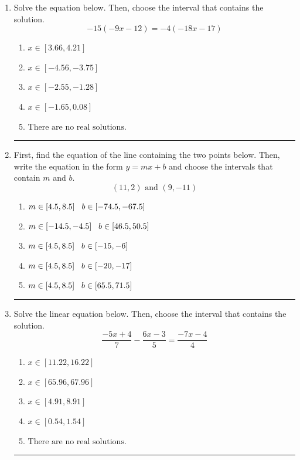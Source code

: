 \documentclass[14pt]{extbook}
\newcommand{\litem}[1]{\item#1\hspace*{-1cm}\rule{\textwidth}{0.4pt}}
\begin{document}
\begin{enumerate}
{\begin{enumerate}[label=\Alph*.]
\end{enumerate} }
\litem{
Solve the equation below. Then, choose the interval that contains the solution.\[ -15(-9x -12) = -4(-18x -17) \]\begin{enumerate}[label=\Alph*.]
\item \( x \in [3.66, 4.21] \)
\item \( x \in [-4.56, -3.75] \)
\item \( x \in [-2.55, -1.28] \)
\item \( x \in [-1.65, 0.08] \)
\item \( \text{There are no real solutions.} \)

\end{enumerate} }
\litem{
First, find the equation of the line containing the two points below. Then, write the equation in the form $ y=mx+b $ and choose the intervals that contain $m$ and $b$.\[ (11, 2) \text{ and } (9, -11) \]\begin{enumerate}[label=\Alph*.]
\item \( m \in [4.5, 8.5] \hspace*{3mm} b \in [-74.5, -67.5] \)
\item \( m \in [-14.5, -4.5] \hspace*{3mm} b \in [46.5, 50.5] \)
\item \( m \in [4.5, 8.5] \hspace*{3mm} b \in [-15, -6] \)
\item \( m \in [4.5, 8.5] \hspace*{3mm} b \in [-20, -17] \)
\item \( m \in [4.5, 8.5] \hspace*{3mm} b \in [65.5, 71.5] \)

\end{enumerate} }
\litem{
Solve the linear equation below. Then, choose the interval that contains the solution.\[ \frac{-5x + 4}{7} - \frac{6x -3}{5} = \frac{-7x -4}{4} \]\begin{enumerate}[label=\Alph*.]
\item \( x \in [11.22, 16.22] \)
\item \( x \in [65.96, 67.96] \)
\item \( x \in [4.91, 8.91] \)
\item \( x \in [0.54, 1.54] \)
\item \( \text{There are no real solutions.} \)

\end{enumerate} }
\end{enumerate}
\end{document}
